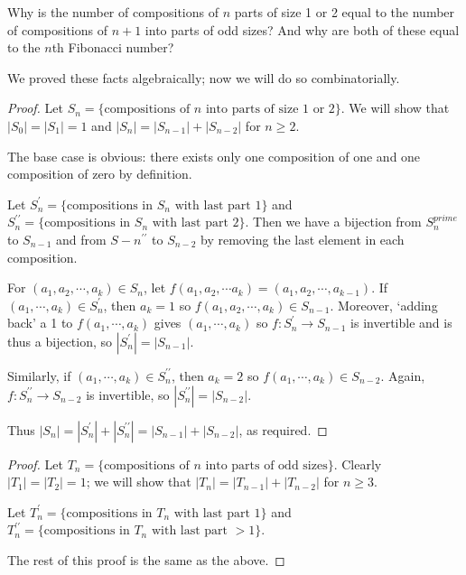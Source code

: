 \documentclass[12pt]{article}
\begin{document}
\begin{example}
Why is the number of compositions of $n$ parts of size 1 or 2 equal to the number of compositions of $n+1$ into parts of odd sizes? And why are both of these equal to the $n$th Fibonacci number?

We proved these facts algebraically; now we will do so combinatorially.

\begin{proof}
Let $S_n = \{\text{compositions of }n\text{ into parts of size 1 or 2}\}$. We will show that $|S_0| = |S_1| = 1$ and $|S_n| = |S_{n-1}| + |S_{n-2}|$ for $n\geq 2$.

The base case is obvious: there exists only one composition of one and one composition of zero by definition.

Let $S_n^\prime = \{\text{compositions in }S_n\text{ with last part }1\}$ and $S_n^{\prime\prime} = \{\text{compositions in }S_n\text{ with last part }2\}$. Then we have a bijection from $S_n^{prime}$ to $S_{n-1}$ and from $S-n^{\prime\prime}$ to $S_{n-2}$ by removing the last element in each composition.

For $(a_1, a_2, \cdots, a_k) \in S_n$, let $f(a_1, a_2, \cdots a_k) = (a_1, a_2, \cdots, a_{k-1})$. If $(a_1, \cdots, a_k) \in S_n^\prime$, then $a_k = 1$ so $f(a_1, a_2, \cdots, a_k) \in S_{n-1}$. Moreover, `adding back' a 1 to $f(a_1, \cdots, a_k)$ gives $(a_1, \cdots, a_k)$ so $f: S_n^\prime \to S_{n-1}$ is invertible and is thus a bijection, so $|S_n^\prime| = |S_{n-1}|$.

Similarly, if $(a_1, \cdots, a_k) \in S_n^{\prime\prime}$, then $a_k = 2$ so $f(a_1, \cdots, a_k) \in S_{n-2}$. Again, $f: S_n^{\prime\prime} \to S_{n-2}$ is invertible, so $|S_n^{\prime\prime}| = |S_{n-2}|$.

Thus $|S_n| = |S_n^\prime| + |S_n^{\prime\prime}| = |S_{n-1}| + |S_{n-2}|$, as required.
\end{proof}

\begin{proof}
Let $T_n = \{\text{compositions of }n\text{ into parts of odd sizes}\}$. Clearly $|T_1| = |T_2| = 1$; we will show that $|T_n| = |T_{n-1}| + |T_{n-2}|$ for $n\geq 3$.

Let $T_n^\prime = \{\text{compositions in }T_n\text{ with last part }1\}$ and $T_n^{\prime\prime} = \{\text{compositions in }T_n\text{ with last part }>1\}$.

The rest of this proof is the same as the above.
\end{proof}
\end{example}
\end{document}
